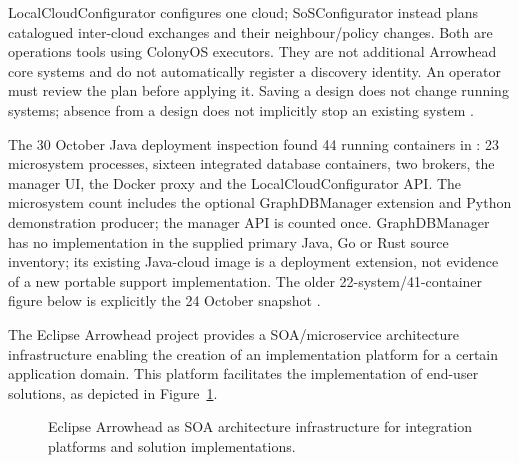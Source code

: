 \documentclass[a4paper]{arrowhead}
\begin{document}
LocalCloudConfigurator configures one cloud; SoSConfigurator instead plans
catalogued inter-cloud exchanges and their neighbour/policy changes. Both are
operations tools using ColonyOS executors. They are not additional Arrowhead
core systems and do not automatically register a discovery identity. An operator
must review the plan before applying it. Saving a design does not change running
systems; absence from a design does not implicitly stop an existing system
\cite{javaLocalCloud20261030,javaSoS20261030}.

The 30 October Java deployment inspection found 44 running containers in
: 23 microsystem processes, sixteen integrated
database containers, two brokers, the manager UI, the Docker proxy and the
LocalCloudConfigurator API. The microsystem count includes the optional
GraphDBManager extension and Python demonstration producer; the manager API is
counted once. GraphDBManager has no implementation in the supplied primary Java,
Go or Rust source inventory; its existing Java-cloud image is a deployment
extension, not evidence of a new portable support implementation. The older
22-system/41-container figure below is explicitly the 24 October snapshot
\cite{roadmapInspection20261030}.



The Eclipse Arrowhead project provides a SOA/microservice architecture infrastructure enabling
the creation of an implementation platform for a certain application domain. This platform
facilitates the implementation of end-user solutions, as depicted in Figure~\ref{fig:concept}.

\begin{figure}[h!]
\centering
{}
\caption{Eclipse Arrowhead as SOA architecture infrastructure for integration platforms and
solution implementations.}
\label{fig:concept}
\end{figure}
\end{document}
